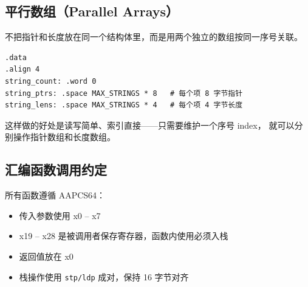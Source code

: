 
\subsection{平行数组（Parallel Arrays）}

不把指针和长度放在同一个结构体里，而是用两个独立的数组按同一序号关联。

\vspace{0.5em}

\begin{verbatim}
.data
.align 4
string_count: .word 0
string_ptrs: .space MAX_STRINGS * 8   # 每个项 8 字节指针
string_lens: .space MAX_STRINGS * 4   # 每个项 4 字节长度
\end{verbatim}

这样做的好处是读写简单、索引直接——只需要维护一个序号 index，
就可以分别操作指针数组和长度数组。

\subsection{汇编函数调用约定}

所有函数遵循 AAPCS64：
\begin{itemize}
    \item 传入参数使用 x0 -- x7
    \item x19 -- x28 是被调用者保存寄存器，函数内使用必须入栈
    \item 返回值放在 x0
    \item 栈操作使用 \texttt{stp/ldp} 成对，保持 16 字节对齐
\end{itemize}
